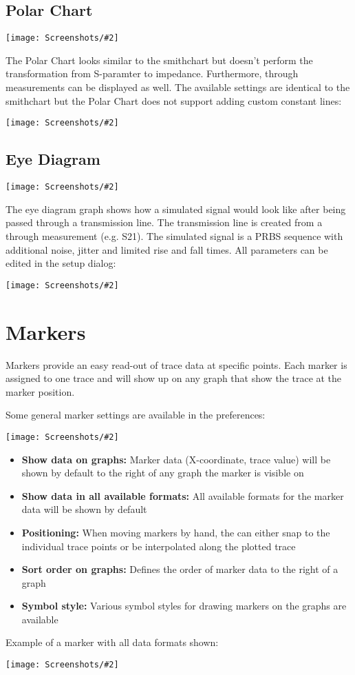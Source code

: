 \documentclass[a4paper,11pt]{article}
\newcommand{\screenshot}[2]{\begin{center}
\texttt{[image: Screenshots/\#2]}
\end{center}}
\begin{document}
\subsection{Polar Chart}
\screenshot{0.6}{GraphPolarplot.png}
The Polar Chart looks similar to the smithchart but doesn't perform the transformation from S-paramter to impedance. Furthermore, through measurements can be displayed as well. The available settings are identical to the smithchart but the Polar Chart does not support adding custom constant lines:
\screenshot{0.6}{GraphPolarchartSetup.png}

\subsection{Eye Diagram}
\screenshot{1.0}{GraphEyeDiagram.png}
The eye diagram graph shows how a simulated signal would look like after being passed through a transmission line. The transmission line is created from a through measurement (e.g. S21). The simulated signal is a PRBS sequence with additional noise, jitter and limited rise and fall times. All parameters can be edited in the setup dialog:
\screenshot{1.0}{GraphEyeDiagramSetup.png}

\section{Markers}
Markers provide an easy read-out of trace data at specific points. Each marker is assigned to one trace and will show up on any graph that show the trace at the marker position.

Some general marker settings are available in the preferences:
\screenshot{1.0}{MarkerPreferences.png}
\begin{itemize}
\item \textbf{Show data on graphs:} Marker data (X-coordinate, trace value) will be shown by default to the right of any graph the marker is visible on
\item \textbf{Show data in all available formats:} All available formats for the marker data will be shown by default
\item \textbf{Positioning:} When moving markers by hand, the can either snap to the individual trace points or be interpolated along the plotted trace
\item \textbf{Sort order on graphs:} Defines the order of marker data to the right of a graph
\item \textbf{Symbol style:} Various symbol styles for drawing markers on the graphs are available
\end{itemize}
\vspace{1cm}
Example of a marker with all data formats shown:
\screenshot{0.8}{MarkerExample.png}
\end{document}
